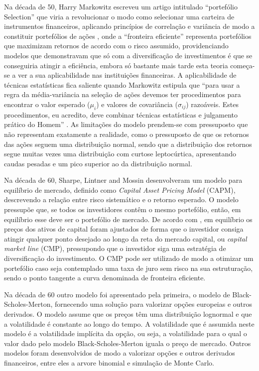 \documentclass[
  12pt,
  a4paper,
  openany]{book}
\theoremstyle{definition}
\theoremstyle{definition}
\theoremstyle{definition}
\theoremstyle{remark}
\begin{document}
Na década de 50, Harry Markowitz escreveu um artigo intitulado ``portefólio Selection'' que viria a revolucionar o modo como selecionar uma carteira de instrumentos financeiros, aplicando princípios de correlação e variância de modo a constituir portefólios de ações , onde a ``fronteira eficiente'' representa portefólios que maximizam retornos de acordo com o risco assumido, providenciando modelos que demonstravam que só com a diversificação de investimentos é que se conseguiria atingir a eficiência, embora só bastante mais tarde esta teoria começa-se a ver a sua aplicabilidade nas instituições financeiras. A aplicabilidade de técnicas estatísticas fica saliente quando Markowitz estipula que ``para usar a regra da média-variância na seleção de ações devemos ter procedimentos para encontrar o valor esperado (\(\mu_i\)) e valores de covariância (\(\sigma_{ij}\)) razoáveis. Estes procedimentos, eu acredito, deve combinar técnicas estatísticas e julgamento prático do Homem'' \citep[pp.91]{Markowitz1952}. As limitações do modelo prendem-se com pressuposto que não representam exatamente a realidade, como o pressuposto de que os retornos das ações seguem uma distribuição normal, sendo que a distribuição dos retornos segue muitas vezes uma distribuição com curtose leptocúrtica, apresentando caudas pesadas e um pico superior ao da distribuição normal.

Na década de 60, Sharpe, Lintner and Mossin desenvolveram um modelo para equilíbrio de mercado, definido como \emph{Capital Asset Pricing Model} (CAPM), descrevendo a relação entre risco sistemático e o retorno esperado. O modelo pressupõe que, se todos os investidores contêm o mesmo portefólio, então, em equilíbrio esse deve ser o portefólio de mercado. De acordo com \citet{Sharpe1964}, em equilíbrio os preços dos ativos de capital foram ajustados de forma que o investidor consiga atingir qualquer ponto desejado ao longo da reta do mercado capital, ou \emph{capital market line} (CMP), pressupondo que o investidor siga uma estratégia de diversificação do investimento. O CMP pode ser utilizado de modo a otimizar um portefólio caso seja contemplado uma taxa de juro sem risco na sua estruturação, sendo o ponto tangente a curva denominada de fronteira eficiente.

Na década de 60 outro modelo foi apresentado pela primeira, o modelo de Black-Scholes-Merton, fornecendo uma solução para valorizar opções europeias e outros derivados. O modelo assume que os preços têm uma distribuição lognormal e que a volatilidade é constante ao longo do tempo. A volatilidade que é assumida neste modelo é a volatilidade implícita da opção, ou seja, a volatilidade para o qual o valor dado pelo modelo Black-Scholes-Merton iguala o preço de mercado. Outros modelos foram desenvolvidos de modo a valorizar opções e outros derivados financeiros, entre eles a arvore binomial e simulação de Monte Carlo.
\end{document}
